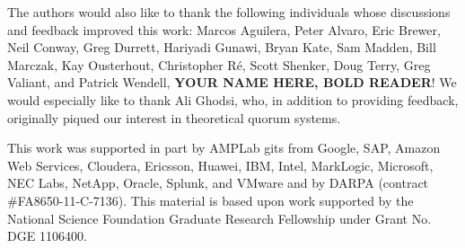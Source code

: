 \documentclass{vldb}
\begin{document}
The authors would also like to thank the following individuals whose
discussions and feedback improved this work: Marcos Aguilera, Peter
Alvaro, Eric Brewer, Neil Conway, Greg Durrett, Hariyadi Gunawi, Bryan
Kate, Sam Madden, Bill Marczak, Kay Ousterhout, Christopher R\'e,
Scott Shenker, Doug Terry, Greg Valiant, and Patrick Wendell,
\textbf{YOUR NAME HERE, BOLD READER}!  We would especially like to thank Ali
Ghodsi, who, in addition to providing feedback, originally piqued our
interest in theoretical quorum systems.

This work was supported in part by AMPLab gits from Google, SAP,
Amazon Web Services, Cloudera, Ericsson, Huawei, IBM, Intel,
MarkLogic, Microsoft, NEC Labs, NetApp, Oracle, Splunk, and VMware and
by DARPA (contract \#FA8650-11-C-7136).  This material is based upon
work supported by the National Science Foundation Graduate Research
Fellowship under Grant No. DGE 1106400.

\balance

\footnotesize


\end{document}
